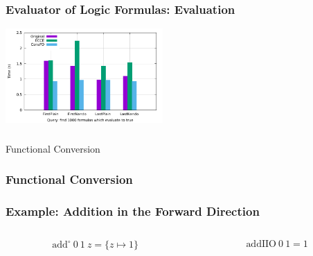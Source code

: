 \documentclass[xcolor={dvipsnames}, aspectratio=169]{beamer}
\begin{document}
\begin{frame}[fragile]
  \frametitle{Evaluator of Logic Formulas: Evaluation}
\begin{table}[!h]
\label{tbl:eval}
\end{table}

\begin{center}
  \includegraphics[width=0.45\textwidth]{fig/prop/prop.pdf}
\end{center}
\end{frame}

\begin{frame}[fragile]
  \frametitle{}

\begin{center}
  \Large Functional Conversion
\end{center}

\end{frame}

\begin{frame}[fragile]
  \frametitle{Functional Conversion}



\end{frame}


\begin{frame}[fragile]
  \frametitle{Example: Addition in the Forward Direction}
\begin{columns}
  \begin{column}[t]{0.49\textwidth}
    
    \[ \text{add}^{\circ}\ 0\ 1\ z = \{z \mapsto 1\}\]
  \end{column}
  \begin{column}[t]{0.49\textwidth}
    
    \[ \text{addIIO}\ 0\ 1 = 1 \] 
  \end{column}
\end{columns}
\end{frame}
\end{document}
